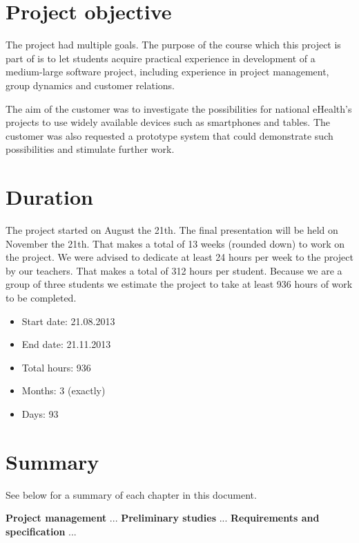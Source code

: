 
\section{Project objective}
\label{section:objective}

The project had multiple goals.
The purpose of the course which this project is part of is to let students acquire practical experience in development of a medium-large software project, including experience in project management, group dynamics and customer relations.

The aim of the customer was to investigate the possibilities for national eHealth's projects to use widely available devices such as smartphones and tables. The customer was also requested a prototype system that could demonstrate such possibilities and stimulate further work.

\section{Duration}
\label{section:duration}
The project started on August the 21th. The final presentation will be held on November the 21th.
That makes a total of 13 weeks (rounded down) to work on the project.
We were advised to dedicate at least 24 hours per week to the project by our teachers.
That makes a total of 312 hours per student. Because we are a group of three students we estimate
the project to take at least 936 hours of work to be completed.

\begin{itemize}
\item Start date: 21.08.2013
\item End date: 21.11.2013
\item Total hours: 936
\item Months: 3 (exactly)
\item Days: 93
\end{itemize}





\section{Summary}

See below for a summary of each chapter in this document.

\textbf{Project management}\newline
...
\textbf{Preliminary studies}\newline
...
\textbf{Requirements and specification}\newline
...